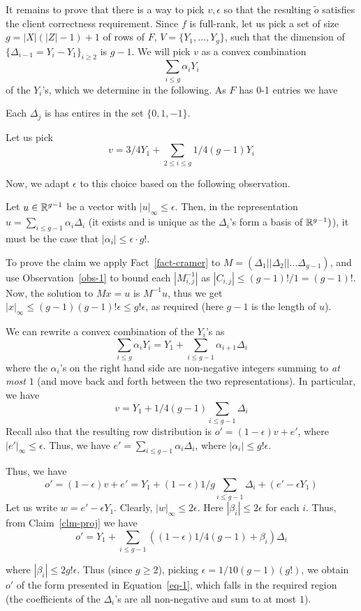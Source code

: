 \documentclass{llncs}
\begin{document}
{It remains to prove that there is a way to pick $v,\epsilon$ 
so that the resulting $\tilde{o}$ satisfies the client correctness requirement.
Since $f$ is full-rank, let us pick  a set of size $g=|X|(|Z|-1)+1$ of rows of $F$, $V = \{Y_1,\ldots,Y_g\}$, such that the dimension of $\{\Delta_{i-1} = Y_i - Y_1\}_{i\geq 2}$ is $g-1$. We will pick $v$ as a convex combination
\[\sum_{i\leq g}\alpha_iY_i\]
of the $Y_i$'s, which we determine in the following.
As $F$ has 0-1 entries we have 
\begin{observation}\label{obs-1}
Each $\Delta_j$ is has entires in the set $\{0,1,-1\}$.
\end{observation}
Let us pick
\[v = 3/4Y_1 + \sum_{2\leq i\leq g}1/4(g-1) Y_i\]

Now, we adapt $\epsilon$ to this choice based on the following observation.
\begin{claim}\label{clm-proj}
Let $u\in {\mathbb R}^{g-1}$ be a vector with $|u|_\infty \leq \epsilon$. 
Then, in the representation $u = \sum_{i\leq g-1}\alpha_i\Delta_i$
(it exists and is unique as the $\Delta_i$'s form a basis of ${\mathbb R}^{g-1})$),
it must be the case that $|\alpha_i|\leq \epsilon \cdot g!$.  
\end{claim}

To prove the claim we apply Fact~\ref{fact-cramer} to $M=(\Delta_1||\Delta_2||\ldots \Delta_{g-1})$, and use Observation~\ref{obs-1} to bound each $|{M}^{-1}_{i,j}|$ as $|C_{i,j}|\leq (g-1)!/1=(g-1)!$. Now, the solution to $Mx=u$ is $M^{-1}u$, thus we get $|x|_\infty\leq (g-1)(g-1)!\epsilon\leq g!\epsilon$, as required (here $g-1$ is the length of $u$).

We can rewrite a convex combination of the $Y_i$'s as
\begin{equation}\label{eq-1}
\sum_{i\leq g}\alpha_iY_i=Y_1+\sum_{i\leq g-1}\alpha_{i+1} \Delta_i
\end{equation}
where the $\alpha_i$'s on the right hand side are non-negative integers summing to \emph{at most} $1$ (and move back and forth between the two representations). In particular, we have
\[v = Y_1+1/4(g-1)\sum_{i\leq g-1}\Delta_i\]
Recall also that the resulting row distribution is
$o'=(1-\epsilon)v + e'$, where $|e'|_\infty\leq \epsilon$.
Thus, we have $e'=\sum_{i\leq g-1}\alpha_i\Delta_i$, where $|\alpha_i|\leq g!\epsilon$. 

Thus, we have
\[o'=(1-\epsilon)v+e'=Y_1+(1-\epsilon)1/g\sum_{i\leq g-1}\Delta_i+(e'-\epsilon Y_1)\]
Let us write $w=e'-\epsilon Y_1$. Clearly, $|w|_\infty\leq 2\epsilon$.
Here $|\beta_i|\leq 2\epsilon$ for each $i$.
Thus, from Claim~\ref{clm-proj} we have
\[o'= Y_1+\sum_{i\leq g-1}((1-\epsilon)1/4(g-1)+\beta_i)\Delta_i\]

where $|\beta_i|\leq 2g!\epsilon$. Thus (since $g\geq 2$), picking $\epsilon=1/10(g-1)(g!)$, we obtain $o'$ of the form presented in Equation~\ref{eq-1}, which falls in the required region (the coefficients of the $\Delta_i$'s are all non-negative and sum to at most $1$). 

}
\end{document}
